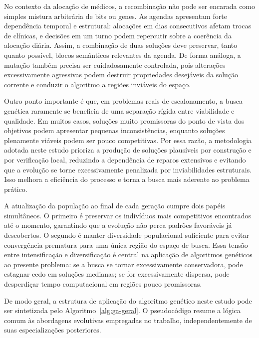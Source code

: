 No contexto da alocação de médicos, a recombinação não pode ser encarada como simples mistura arbitrária de bits ou genes. As agendas apresentam forte dependência temporal e estrutural: alocações em dias consecutivos afetam trocas de clínicas, e decisões em um turno podem repercutir sobre a coerência da alocação diária. Assim, a combinação de duas soluções deve preservar, tanto quanto possível, blocos semânticos relevantes da agenda. De forma análoga, a mutação também precisa ser cuidadosamente controlada, pois alterações excessivamente agressivas podem destruir propriedades desejáveis da solução corrente e conduzir o algoritmo a regiões inviáveis do espaço.

Outro ponto importante é que, em problemas reais de escalonamento, a busca genética raramente se beneficia de uma separação rígida entre viabilidade e qualidade. Em muitos casos, soluções muito promissoras do ponto de vista dos objetivos podem apresentar pequenas inconsistências, enquanto soluções plenamente viáveis podem ser pouco competitivas. Por essa razão, a metodologia adotada neste estudo prioriza a produção de soluções plausíveis por construção e por verificação local, reduzindo a dependência de reparos extensivos e evitando que a evolução se torne excessivamente penalizada por inviabilidades estruturais. Isso melhora a eficiência do processo e torna a busca mais aderente ao problema prático.

A atualização da população ao final de cada geração cumpre dois papéis simultâneos. O primeiro é preservar os indivíduos mais competitivos encontrados até o momento, garantindo que a evolução não perca padrões favoráveis já descobertos. O segundo é manter diversidade populacional suficiente para evitar convergência prematura para uma única região do espaço de busca. Essa tensão entre intensificação e diversificação é central na aplicação de algoritmos genéticos ao presente problema: se a busca se tornar excessivamente conservadora, pode estagnar cedo em soluções medianas; se for excessivamente dispersa, pode desperdiçar tempo computacional em regiões pouco promissoras.

De modo geral, a estrutura de aplicação do algoritmo genético neste estudo pode ser sintetizada pelo Algoritmo~\ref{alg:ga-geral}. O pseudocódigo resume a lógica comum às abordagens evolutivas empregadas no trabalho, independentemente de suas especializações posteriores.

